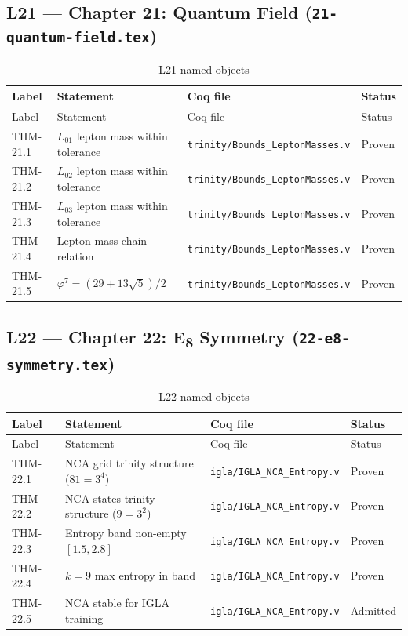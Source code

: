 \subsection{L21 — Chapter 21: Quantum Field
  (\texttt{21-quantum-field.tex})}
\label{sec:A-L21}

\begin{longtable}{lp{6cm}ll}
\toprule
Label & Statement & Coq file & Status \\
\midrule
\endfirsthead
\toprule
Label & Statement & Coq file & Status \\
\midrule
\endhead
\bottomrule
\endfoot
\bottomrule
\caption{L21 named objects}
\endlastfoot
THM-21.1 & $L_{01}$ lepton mass within tolerance &
  \texttt{trinity/Bounds\_LeptonMasses.v} & Proven \\
THM-21.2 & $L_{02}$ lepton mass within tolerance &
  \texttt{trinity/Bounds\_LeptonMasses.v} & Proven \\
THM-21.3 & $L_{03}$ lepton mass within tolerance &
  \texttt{trinity/Bounds\_LeptonMasses.v} & Proven \\
THM-21.4 & Lepton mass chain relation &
  \texttt{trinity/Bounds\_LeptonMasses.v} & Proven \\
THM-21.5 & $\varphi^{7} = (29+13\sqrt{5})/2$ &
  \texttt{trinity/Bounds\_LeptonMasses.v} & Proven \\
\end{longtable}

\subsection{L22 — Chapter 22: E\textsubscript{8} Symmetry
  (\texttt{22-e8-symmetry.tex})}
\label{sec:A-L22}

\begin{longtable}{lp{6cm}ll}
\toprule
Label & Statement & Coq file & Status \\
\midrule
\endfirsthead
\toprule
Label & Statement & Coq file & Status \\
\midrule
\endhead
\bottomrule
\endfoot
\bottomrule
\caption{L22 named objects}
\endlastfoot
THM-22.1 & NCA grid trinity structure ($81 = 3^{4}$) &
  \texttt{igla/IGLA\_NCA\_Entropy.v} & Proven \\
THM-22.2 & NCA states trinity structure ($9 = 3^{2}$) &
  \texttt{igla/IGLA\_NCA\_Entropy.v} & Proven \\
THM-22.3 & Entropy band non-empty $[1.5, 2.8]$ &
  \texttt{igla/IGLA\_NCA\_Entropy.v} & Proven \\
THM-22.4 & $k=9$ max entropy in band &
  \texttt{igla/IGLA\_NCA\_Entropy.v} & Proven \\
THM-22.5 & NCA stable for IGLA training &
  \texttt{igla/IGLA\_NCA\_Entropy.v} & Admitted \\
\end{longtable}

